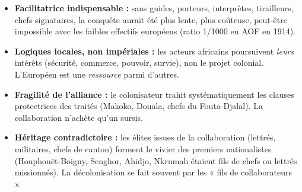 \documentclass[11pt]{article}
\newcommand{\cle}[1]{{\popxbold\color{popdark}#1}}
\begin{document}
\begin{aretenir}
\begin{itemize}
    \item \textbf{Facilitatrice indispensable :} sans guides, porteurs, interprètes, tirailleurs, chefs signataires, la conquête aurait été plus lente, plus coûteuse, peut-être impossible avec les faibles effectifs européens (ratio 1/1000 en AOF en 1914).
    \item \textbf{Logiques locales, non impériales :} les acteurs africains poursuivent \emph{leurs} intérêts (sécurité, commerce, pouvoir, survie), non le projet colonial. L'Européen est une \emph{ressource} parmi d'autres.
    \item \textbf{Fragilité de l'alliance :} le colonisateur trahit systématiquement les clauses protectrices des traités (Makoko, Douala, chefs du Fouta-Djalal). La collaboration n'achète qu'un sursis.
    \item \textbf{Héritage contradictoire :} les élites issues de la collaboration (lettrés, militaires, chefs de canton) forment le vivier des premiers nationalistes (Houphouët-Boigny, Senghor, Ahidjo, Nkrumah étaient fils de chefs ou lettrés missionnés). La \cle{décolonisation} se fait souvent par les « fils de collaborateurs ».
\end{itemize}
\end{aretenir}
\end{document}
